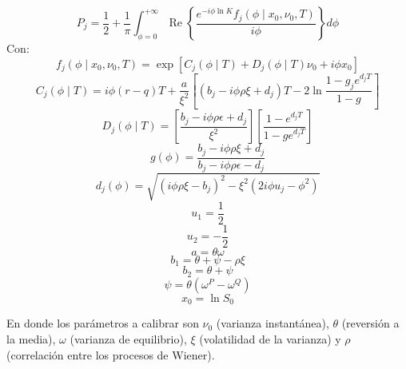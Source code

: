 \begin{equation}
    P_{j}=\frac{1}{2}+\frac{1}{\pi} \int_{\phi=0}^{+\infty} \operatorname{Re}\left\{\frac{e^{-i \phi \ln K} f_{j}\left(\phi \mid x_{0}, \nu_{0}, T\right)}{i \phi}\right\} d \phi
\end{equation}
\newpage
\noindent Con:
\begin{equation*}
    f_{j}\left(\phi \mid x_{0}, \nu_{0}, T\right)=\exp \left[C_{j}(\phi \mid T)+D_{j}(\phi \mid T) \nu_{0}+i \phi x_{0}\right]
\end{equation*}
\begin{equation*}
    C_{j}(\phi \mid T)=i \phi(r-q) T+\frac{a}{\xi^{2}}\left[\left(b_{j}-i \phi \rho \xi+d_{j}\right) T-2 \ln \frac{1-g_j e^{d_jT} }{1-g}\right]
\end{equation*}
\begin{equation*}
    D_{j}(\phi \mid T)=\left[\frac{b_j-i \phi \rho \epsilon+d_{j}}{\xi^{2}}\right]\left[\frac{1-e^{d_jT}}{1-g e^{d_jT}}\right]
\end{equation*}
\begin{equation*}
    g(\phi)=\frac{b_{j}-i \phi \rho \xi+d_{j}}{b_{j}-i \phi \rho \epsilon-d_{j}}
\end{equation*}
\begin{equation*}
    d_{j}(\phi)=\sqrt{\left(i \phi \rho \xi-b_{j}\right)^{2}-\xi^{2}\left(2 i \phi u_{j}-\phi^{2}\right)}
\end{equation*}
\begin{equation*}
    u_1=\frac{1}{2}
\end{equation*}
\begin{equation*}
    u_2=-\frac{1}{2}
\end{equation*}
\begin{equation*}
    a=\theta \omega
\end{equation*}
\begin{equation*}
    b_{1}=\theta+\psi-\rho \xi
\end{equation*}
\begin{equation*}
    b_{2}=\theta+\psi
\end{equation*}
\begin{equation*}
    \psi=\theta\left(\omega^{P}-\omega^{Q}\right)
\end{equation*}
\begin{equation*}
    x_{0}=\ln S_{0}
\end{equation*}

\noindent En donde los parámetros a calibrar son $\nu_0$ (varianza instantánea), $\theta$ (reversión  a la media), $\omega$ (varianza de equilibrio), $\xi$ (volatilidad de la varianza) y $\rho$ (correlación entre los procesos de Wiener).

\newpage